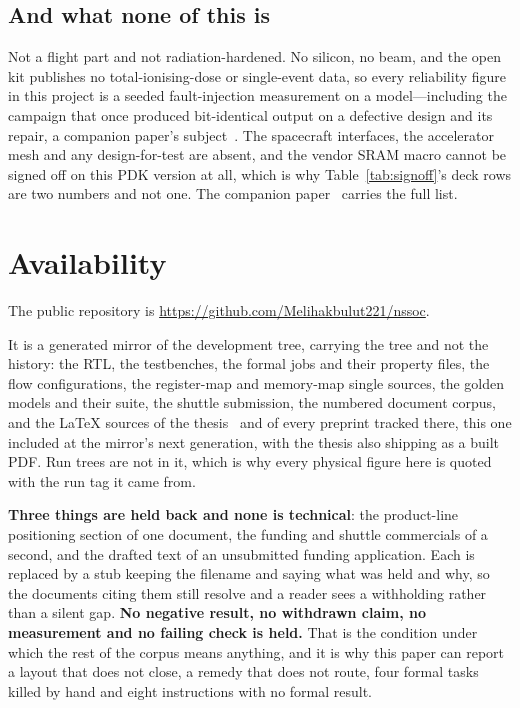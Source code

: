 \documentclass[11pt,a4paper]{article}
\begin{document}
\subsection{And what none of this is}

Not a flight part and not radiation-hardened. No silicon, no beam, and
the open kit publishes no total-ionising-dose or single-event data, so
every reliability figure in this project is a seeded fault-injection
measurement on a model---including the campaign that once produced
bit-identical output on a defective design and its repair, a companion
paper's subject~\cite{companion_tmr}. The spacecraft interfaces, the
accelerator mesh and any design-for-test are absent, and the vendor
SRAM macro cannot be signed off on this PDK version at all, which is
why Table~\ref{tab:signoff}'s deck rows are two numbers and not one.
The companion paper~\cite{companion_design} carries the full list.

\section{Availability}
\label{sec:avail}

The public repository is \url{https://github.com/Melihakbulut221/nssoc}.

It is a generated mirror of the development tree, carrying the tree and
not the history: the RTL, the testbenches, the formal jobs and their
property files, the flow configurations, the register-map and
memory-map single sources, the golden models and their suite, the
shuttle submission, the numbered document corpus, and the LaTeX sources
of the thesis~\cite{thesis_nssoc} and of every preprint tracked there,
this one included at the mirror's next generation, with the thesis also
shipping as a built PDF. Run trees are not in
it, which is why every physical figure here is quoted with the run tag
it came from.

\textbf{Three things are held back and none is technical}: the
product-line positioning section of one document, the funding and
shuttle commercials of a second, and the drafted text of an unsubmitted
funding application. Each is replaced by a stub keeping the filename and
saying what was held and why, so the documents citing them still
resolve and a reader sees a withholding rather than a silent gap.
\textbf{No negative result, no withdrawn claim, no measurement and no
failing check is held.} That is the condition under which the rest of
the corpus means anything, and it is why this paper can report a layout
that does not close, a remedy that does not route, four formal tasks
killed by hand and eight instructions with no formal result.
\end{document}
